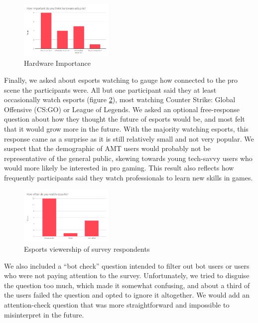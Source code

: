 \documentclass[11pt,manuscript,screen,review]{acmart} %
\begin{document}
\begin{figure}[h]
    \centering
    \includegraphics[width=0.4\textwidth]{img/amt-hardware.png}
    \caption{Hardware Importance}
    \label{fig:amt-hardware}
\end{figure}

Finally, we asked about esports watching to gauge how connected to the pro scene the participants were. All but one participant said they at least occasionally watch esports (figure \ref{fig:amt-esports}), most watching Counter Strike: Global Offensive (CS:GO) or League of Legends. We asked an optional free-response question about how they thought the future of esports would be, and most felt that it would grow more in the future. With the majority watching esports, this response came as a surprise as it is still relatively small and not very popular. We suspect that the demographic of AMT users would probably not be representative of the general public, skewing towards young tech-savvy users who would more likely be interested in pro gaming. This result also reflects how frequently participants said they watch professionals to learn new skills in games.

\begin{figure}[h]
    \centering
    \includegraphics[width=0.4\textwidth]{img/amt-esports.png}
    \caption{Esports viewership of survey respondents}
    \label{fig:amt-esports}
\end{figure}

We also included a “bot check” question intended to filter out bot users or users who were not paying attention to the survey. Unfortunately, we tried to disguise the question too much, which made it somewhat confusing, and about a third of the users failed the question and opted to ignore it altogether. We would add an attention-check question that was more straightforward and impossible to misinterpret in the future. 
\end{document}
